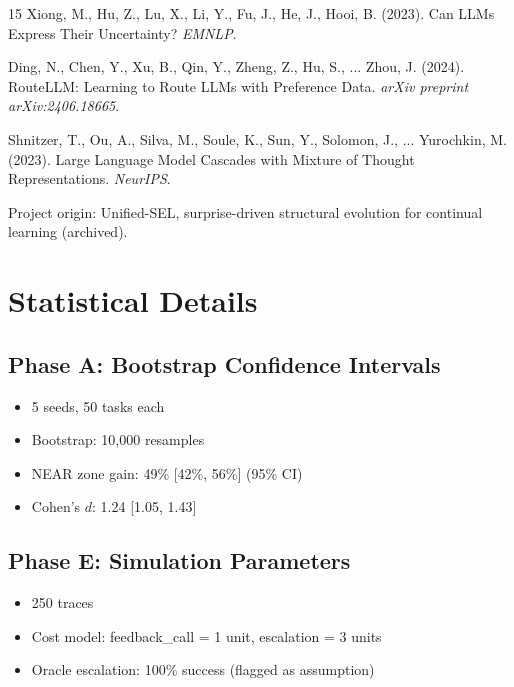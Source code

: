 \documentclass[11pt,a4paper]{article}
\begin{document}
\begin{thebibliography}{15}
 Xiong, M., Hu, Z., Lu, X., Li, Y., Fu, J., He, J.,  Hooi, B. (2023). Can LLMs Express Their Uncertainty? \textit{EMNLP}.

 Ding, N., Chen, Y., Xu, B., Qin, Y., Zheng, Z., Hu, S., ...  Zhou, J. (2024). RouteLLM: Learning to Route LLMs with Preference Data. \textit{arXiv preprint arXiv:2406.18665}.

 Shnitzer, T., Ou, A., Silva, M., Soule, K., Sun, Y., Solomon, J., ...  Yurochkin, M. (2023). Large Language Model Cascades with Mixture of Thought Representations. \textit{NeurIPS}.

 Project origin: Unified-SEL, surprise-driven structural evolution for continual learning (archived).

\end{thebibliography}

\appendix

\section{Statistical Details}

\subsection{Phase A: Bootstrap Confidence Intervals}

\begin{itemize}
    \item 5 seeds, 50 tasks each
    \item Bootstrap: 10,000 resamples
    \item NEAR zone gain: 49\% [42\%, 56\%] (95\% CI)
    \item Cohen's $d$: 1.24 [1.05, 1.43]
\end{itemize}

\subsection{Phase E: Simulation Parameters}

\begin{itemize}
    \item 250 traces
    \item Cost model: feedback\_call = 1 unit, escalation = 3 units
    \item Oracle escalation: 100\% success (flagged as assumption)
\end{itemize}
\end{document}
